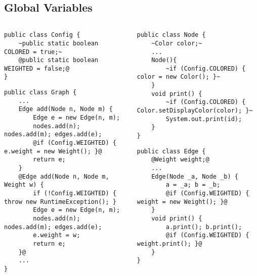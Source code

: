\subsection{Global Variables}
\begin{frame}[fragile]{\insertsubsection}
		\begin{columns}
\begin{tiny}
\begin{lstlisting}
public class Config {
	~public static boolean COLORED = true;~
	@public static boolean WEIGHTED = false;@
}
\end{lstlisting}
\begin{lstlisting}
public class Graph {
	...
	Edge add(Node n, Node m) {
		Edge e = new Edge(n, m);
		nodes.add(n); nodes.add(m); edges.add(e);
		@if (Config.WEIGHTED) { e.weight = new Weight(); }@
		return e;
	}
	@Edge add(Node n, Node m, Weight w) {
		if (!Config.WEIGHTED) { throw new RuntimeException(); }
		Edge e = new Edge(n, m);
		nodes.add(n); nodes.add(m); edges.add(e);
		e.weight = w;
		return e;
	}@
	...
}
\end{lstlisting}
\end{tiny}	
\begin{tiny}
\begin{lstlisting}
public class Node {
	~Color color;~
	...
	Node(){
		~if (Config.COLORED) { color = new Color(); }~
	}
	void print() {
		~if (Config.COLORED) { Color.setDisplayColor(color); }~
		System.out.print(id);
	}
}
\end{lstlisting}
\begin{lstlisting}
public class Edge {
	@Weight weight;@
	...
	Edge(Node _a, Node _b) {
		a = _a; b = _b;
		@if (Config.WEIGHTED) { weight = new Weight(); }@
	}
	void print() {
		a.print(); b.print();
		@if (Config.WEIGHTED) { weight.print(); }@
	}
}
\end{lstlisting}
\end{tiny}	
		\end{columns}
\end{frame}

